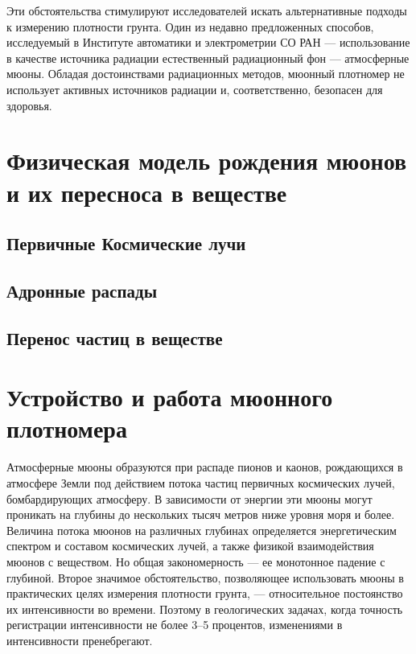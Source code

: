 Эти обстоятельства стимулируют исследователей искать альтернативные подходы к измерению плотности грунта. 
Один из недавно предложенных способов, исследуемый в Институте автоматики и электрометрии СО РАН \cite{patentdensitometer} ---
использование в качестве источника радиации естественный радиационный фон --- атмосферные мюоны. 
Обладая достоинствами радиационных методов, мюонный плотномер 
не использует активных источников радиации и, соответственно, безопасен для здоровья. 

\section{Физическая модель рождения мюонов и их пересноса в веществе}\label{sect1_2}

\subsection{Первичные Космические лучи}\label{subsect1_2_1}

\subsection{Адронные распады}\label{subsect1_2_2}

\subsection{Перенос частиц в веществе}\label{subsect1_2_3} %


\section{Устройство и работа мюонного плотномера}\label{sect1_3}

Атмосферные мюоны образуются при распаде пионов и каонов, 
рождающихся в атмосфере Земли под действием потока частиц 
первичных космических лучей, бомбардирующих атмосферу. 
В зависимости от энергии эти мюоны могут проникать на глубины 
до нескольких тысяч метров ниже уровня моря и более. Величина 
потока мюонов на различных глубинах определяется 
энергетическим спектром и составом космических лучей, 
а также физикой взаимодействия мюонов с веществом. Но общая 
закономерность --- ее монотонное падение с глубиной. 
Второе значимое обстоятельство, позволяющее использовать мюоны 
в практических целях измерения плотности грунта, --- относительное 
постоянство их интенсивности во времени. Поэтому 
в геологических задачах, когда точность регистрации 
интенсивности не более 3--5 процентов,  
изменениями в интенсивности пренебрегают.

